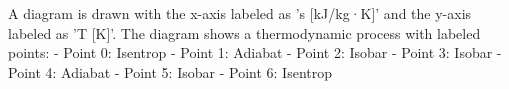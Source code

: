 A diagram is drawn with the x-axis labeled as 's [kJ/kg·K]' and the y-axis labeled as 'T [K]'. The diagram shows a thermodynamic process with labeled points:  
- Point 0: Isentrop  
- Point 1: Adiabat  
- Point 2: Isobar  
- Point 3: Isobar  
- Point 4: Adiabat  
- Point 5: Isobar  
- Point 6: Isentrop